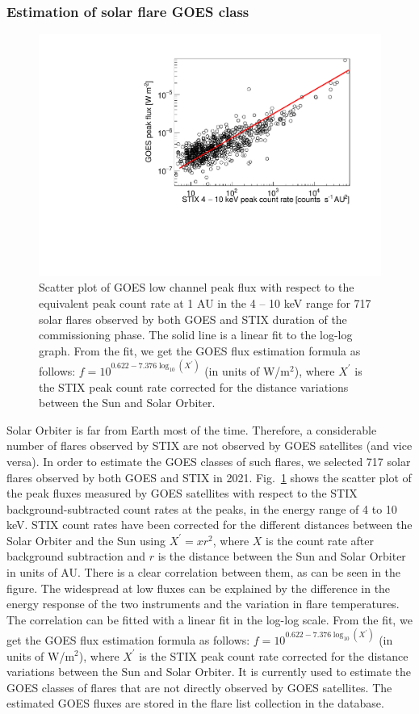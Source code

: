 \documentclass[referee]{aa} %
\begin{document}
\subsubsection{Estimation of solar flare GOES class }
\begin{figure}
  \centering
  \includegraphics[width=0.8\linewidth]{figures/goes_stix_flux_paper.pdf}
  \caption{Scatter plot of GOES low channel peak flux with respect to the equivalent  peak count rate  at 1 AU  in the 4 -- 10 keV range for 717 solar flares observed by both GOES and STIX duration of the commissioning phase.   The solid line is a linear fit to the log-log graph. 
From the fit, we get the GOES flux estimation formula as follows:  $f = 10^{0.622 -7.376 \log_{10} (X^{'})}$ (in units of W/m$^2$),
where $X^{'}$ is the STIX peak count rate corrected for the distance variations between the Sun and Solar Orbiter. }
\label{fig:goes-stix}
\end{figure}
Solar Orbiter is far from Earth most of the time. 
Therefore, a considerable number of flares observed by STIX 
are not observed by GOES satellites (and vice versa). 
In order to estimate the GOES classes of such flares, 
we selected 717 solar flares observed by both GOES and STIX in 2021. 
Fig.~\ref{fig:goes-stix} shows the scatter plot of the peak fluxes
measured by GOES satellites with respect to the STIX background-subtracted count rates at the peaks, 
 in the energy range of 4 to 10 keV. 
STIX count rates have been corrected for 
the different distances between the Solar Orbiter and the Sun using $X^{'}=x r^2$,
where $X$ is the count rate after background subtraction
 and $r$ is the distance between the Sun and Solar Orbiter in units of AU.  There is a clear correlation between them, as can be seen in the figure.  The widespread at low fluxes can be explained by the difference in 
the energy response of the two instruments and the variation in flare temperatures. 
The correlation can be fitted with a linear fit in the log-log scale. 
From the fit, we get the GOES flux estimation formula as follows: 
$f = 10^{0.622 -7.376 \log_{10} (X^{'})}$ (in units of W/m$^2$), where $X^{'}$ is the STIX peak count rate corrected for the distance variations between the Sun and Solar Orbiter. It is currently used to estimate the GOES classes of flares that are not directly observed by GOES satellites.  The estimated GOES fluxes are stored in the flare list collection in the database. 
\end{document}
